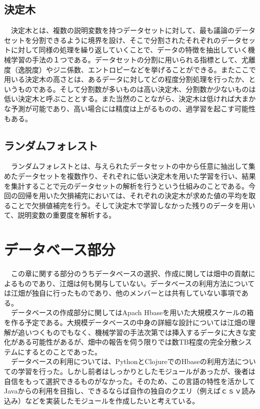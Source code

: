 \documentclass{scrartcl}
\begin{document}
\subsection{決定木}
\label{sec:orgda66a07}
　決定木とは、複数の説明変数を持つデータセットに対して、最も議論のデータセットを分割できるように境界を設け、そこで分割されたそれぞれのデータセットに対して同様の処理を繰り返していくことで、データの特徴を抽出していく機械学習の手法の１つである。データセットの分割に用いられる指標として、尤離度（逸脱度）やジニ係数、エントロピーなどを挙げることができる。またここで用いる決定木の高さとは、あるデータに対してどの程度分割処理を行ったか、というものである。そして分割数が多いものは高い決定木、分割数か少ないものは低い決定木と呼ぶこととする。また当然のことながら、決定木は低ければ大まかな予測が可能であり、高い場合には精度は上がるものの、過学習を起こす可能性もある。\\
\subsection{ランダムフォレスト}
\label{sec:orgee1b924}
　ランダムフォレストとは、与えられたデータセットの中から任意に抽出して集めたデータセットを複数作り、それぞれに低い決定木を用いた学習を行い、結果を集計することで元のデータセットの解析を行うという仕組みのことである。今回の回帰を用いた欠損補完においては、それぞれの決定木が求めた値の平均を取ることで欠損値補完を行う。そして決定木で学習しなかった残りのデータを用いて、説明変数の重要度を解析する。\\

\section{データベース部分}
\label{sec:org23c54de}
　この章に関する部分のうちデータベースの選択、作成に関しては畑中の貢献によるものであり、江畑は何も関与していない。データベースの利用方法については江畑が独自に行ったものであり、他のメンバーとは共有していない事項である。\\
　データベースの作成部分に関してはApach Hbaseを用いた大規模スケールの箱を作る予定である。大規模データベースの中身の詳細な設計については江畑の理解が追いつくものでもなく、機械学習の手法次第では挿入するデータに大きな変化がある可能性があるが、畑中の報告を伺う限りでは数TB程度の完全分散システムにするとのことであった。\\
　データベースの利用については、PythonとClojureでのHbaseの利用方法についての学習を行った。しかし前者はしっかりとしたモジュールがあったが、後者は自信をもって選択できるものがなかった。そのため、この言語の特性を活かしてJavaからの利用を目指し、できるならば自作の独自のクエリ（例えばｃｓｖ読み込み）などを実装したモジュールを作成したいと考えている。\\
\end{document}
